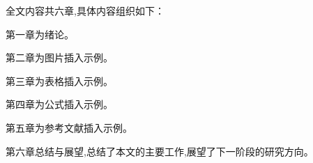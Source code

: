 全文内容共六章,具体内容组织如下：

第一章为绪论。

第二章为图片插入示例。

第三章为表格插入示例。

第四章为公式插入示例。

第五章为参考文献插入示例。

第六章总结与展望,总结了本文的主要工作,展望了下一阶段的研究方向。










